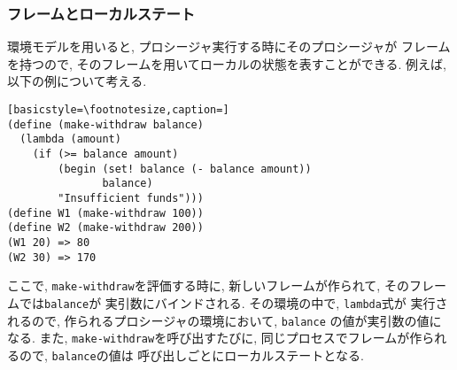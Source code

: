 \setcounter{subsubsection}{2}
\subsubsection{フレームとローカルステート}
環境モデルを用いると, プロシージャ実行する時にそのプロシージャが
フレームを持つので, そのフレームを用いてローカルの状態を表すことができる.
例えば, 以下の例について考える.

\begin{lstlisting}[basicstyle=\footnotesize,caption=]
(define (make-withdraw balance)
  (lambda (amount)
    (if (>= balance amount)
        (begin (set! balance (- balance amount))
               balance)
        "Insufficient funds")))
(define W1 (make-withdraw 100))
(define W2 (make-withdraw 200))
(W1 20) => 80
(W2 30) => 170
\end{lstlisting}

ここで, \lstinline{make-withdraw}を評価する時に,
新しいフレームが作られて, そのフレームでは\lstinline{balance}が
実引数にバインドされる. その環境の中で, \lstinline{lambda}式が
実行されるので, 作られるプロシージャの環境において, \lstinline{balance}
の値が実引数の値になる. また, \lstinline{make-withdraw}を呼び出すたびに,
同じプロセスでフレームが作られるので, \lstinline{balance}の値は
呼び出しごとにローカルステートとなる.
